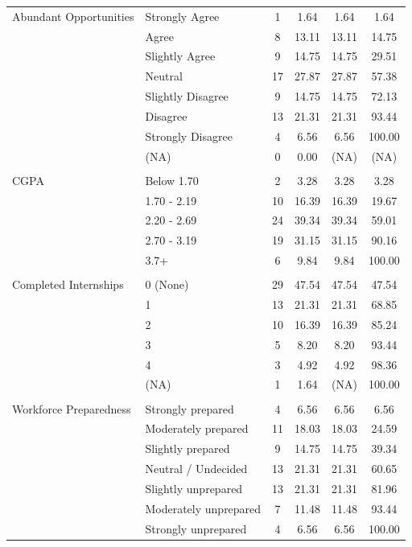 \documentclass{article}
\begin{document}
\begin{longtable}{llcccc}
        Abundant Opportunities & Strongly Agree & 1 & 1.64 & 1.64 & 1.64 \\
        & Agree & 8 & 13.11 & 13.11 & 14.75 \\
        & Slightly Agree & 9 & 14.75 & 14.75 & 29.51 \\
        & Neutral & 17 & 27.87 & 27.87 & 57.38 \\
        & Slightly Disagree & 9 & 14.75 & 14.75 & 72.13 \\
        & Disagree & 13 & 21.31 & 21.31 & 93.44 \\
        & Strongly Disagree & 4 & 6.56 & 6.56 & 100.00 \\
        & (NA) & 0 & 0.00 & (NA) & (NA) \\\\

        CGPA & Below 1.70 & 2 & 3.28 & 3.28 & 3.28\\
        & 1.70 - 2.19 & 10 & 16.39 & 16.39 & 19.67\\
        & 2.20 - 2.69 & 24 & 39.34 & 39.34 & 59.01\\
        & 2.70 - 3.19 & 19 & 31.15 & 31.15 & 90.16\\
        & 3.7+ & 6 & 9.84 & 9.84 & 100.00\\\\

        Completed Internships & 0 (None) & 29 & 47.54 & 47.54 & 47.54\\
        & 1 & 13 & 21.31 & 21.31 & 68.85\\
        & 2 & 10 & 16.39 & 16.39 & 85.24\\
        & 3 & 5 & 8.20 & 8.20 & 93.44\\
        & 4 & 3 & 4.92 & 4.92 & 98.36\\
        & (NA) & 1 & 1.64 & (NA) & 100.00\\\\
        
        Workforce Preparedness & Strongly prepared & 4 & 6.56 & 6.56 & 6.56\\
        & Moderately prepared & 11 & 18.03 & 18.03 & 24.59\\
        & Slightly prepared & 9 & 14.75 & 14.75 & 39.34\\
        & Neutral / Undecided & 13 & 21.31 & 21.31 & 60.65\\
        & Slightly unprepared & 13 & 21.31 & 21.31 & 81.96\\
        & Moderately unprepared & 7 & 11.48 & 11.48 & 93.44\\
        & Strongly unprepared & 4 & 6.56 & 6.56 & 100.00\\
        
        
    \hline
    \end{longtable}
\endgroup
\end{document}
